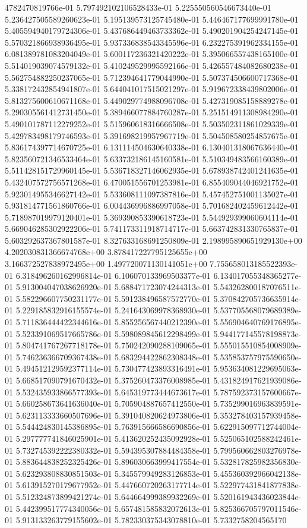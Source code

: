 4782470819766e-01	5.797492102106528433e-01	5.225550560546673440e-01	5.236427505589260623e-01	5.195139573125745480e-01	5.446467177699991780e-01	5.405594940179724306e-01	5.437686449463733362e-01	5.490201904254247145e-01	5.570321866938936495e-01	5.937336838543345596e-01	6.232275391962334155e-01	6.081389781083204049e-01	5.600117236321420222e-01	5.395066557438165100e-01	5.514019039074579132e-01	5.410249529995592166e-01	5.426557484082680238e-01	5.562754882250237065e-01	5.712394641779044990e-01	5.507374506600717368e-01	5.338172432854941807e-01	5.644041017515021297e-01	5.919672338439802006e-01	5.813275600610671168e-01	5.449029774988096708e-01	5.427319085158889278e-01	5.290305561412731450e-01	5.389466077884760287e-01	5.251514911308984290e-01	5.490101787112279252e-01	5.515960618316666508e-01	5.503502311861029339e-01	5.429783498179746593e-01	5.391698219957967719e-01	5.504508580254857675e-01	5.836174397714670725e-01	6.131114504630640338e-01	6.130401318067636440e-01	5.823560721346533464e-01	5.633732186145160581e-01	5.510349483566160389e-01	5.511428151729960145e-01	5.536718327146062935e-01	5.678938742401241635e-01	5.432407572756571268e-01	6.470051556701253981e-01	6.855409044046921752e-01	5.923014955346627142e-01	5.533608111097387816e-01	5.457452751001135027e-01	5.931814771561860766e-01	6.004436996886997058e-01	5.701682402459612442e-01	5.718987019979120401e-01	5.369390853390618723e-01	5.544929399060604114e-01	5.669046285302922206e-01	5.741173311918714717e-01	5.663742831330765837e-01	5.603292637367801587e-01	8.327633168691250809e-01	2.198995890651929130e+00	4.202030831366674768e+00	3.878417227795125655e+00	3.166372527838972495e+00	1.497720071130141051e+00	7.755658013185522393e-01	6.318496260162996814e-01	6.106070133969503377e-01	6.134017055348365277e-01	5.913004047038626920e-01	5.688471723074244313e-01	5.543262800187076511e-01	5.582296607750231177e-01	5.591238496587572770e-01	5.370842705736635914e-01	5.229185832916155574e-01	5.241643069978368930e-01	5.537705568079689389e-01	5.711836444422344616e-01	5.855256567440212390e-01	5.556904640769176895e-01	5.523391069517665786e-01	5.598089845612298499e-01	5.944177145578198873e-01	5.804741767267718178e-01	5.750242090288109065e-01	5.555015510854008909e-01	5.746236366709367438e-01	5.683294422862308348e-01	5.535853757975590650e-01	5.494512129592377114e-01	5.730477423893316491e-01	5.953634081229695063e-01	5.668517090791670432e-01	5.375260473376008985e-01	5.431824917621939086e-01	5.532435933866577393e-01	5.645319773444673617e-01	5.787592373157600667e-01	5.660258673641636040e-01	5.705904887657412550e-01	5.735299016963839591e-01	5.623113333660507696e-01	5.391040820624973806e-01	5.353278403157939458e-01	5.544424830145386895e-01	5.763915666586690856e-01	5.622915097712744004e-01	5.297777741846025901e-01	5.413620252435092928e-01	5.525065102588242461e-01	5.732745392222380332e-01	5.594395307884484358e-01	5.799560662803276978e-01	5.883644838252325426e-01	5.896030663999417554e-01	5.532817825982356830e-01	5.623293808830851503e-01	5.345579949283126853e-01	5.455360392966042138e-01	5.613915270179677952e-01	5.447660720263177714e-01	5.522977431841877838e-01	5.512324873899421274e-01	5.644664999389932269e-01	5.520161943436023844e-01	5.442399517774340056e-01	5.657481585832072613e-01	5.825366705797011546e-01	5.913133263779155602e-01	5.782330375343078810e-01	5.7332758204565170